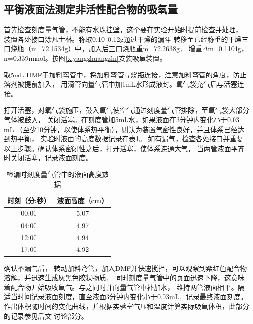 \documentclass[a4paper,zihao=5,UTF8]{ctexart}
\begin{document}
    \subsection{平衡液面法测定非活性配合物的吸氧量}
    首先检查刻度量气管，不能有水珠挂壁，这个要在实验开始时提前检查并处理，
    装置各处接口涂凡士林。称取0.10~0.12g\ce{[Co(II)(Salen)]}通过干燥的漏斗
    转移至已经称重的干燥三口烧瓶（m=72.1534g）中，加入后三口烧瓶重m=72.2638g，
    增重$\Delta$m=0.1104g，n=0.339mmol。按图\ref{xiyangzhuangzhi}安装吸氧装置。
    \par 
    取5mL DMF于加料弯管中，将加料弯管与烧瓶连接，注意加料弯管的角度，防止溶剂被提前加入，
    用滴管向量气管中加1mL水形成液封。氧气袋充气后与活塞连接。
    \par 
	打开活塞，对氧气袋施压，鼓入氧气使空气通过刻度量气管排除，至氧气袋大部分气体被鼓入，
    关闭活塞。在刻度管加5mL水，如果液面在3分钟内变化小于0.03 mL
    （至少10分钟，以使体系热平衡），则认为装置气密性良好，并且体系已经达到热平衡，
    实验时液面的高度数据记录在表\ref{jianlougaodushuju}。
    如有漏气，检查各处接口并重复以上步骤。确认体系密闭性之后，打开活塞，使体系连通大气，
    当两管液面平齐时关闭活塞，记录液面刻度。
    \begin{table}[htbp]
        \caption{检漏时刻度量气管中的液面高度数据}
        \centering
        \label{jianlougaodushuju}
        \begin{tabular}[htbp]{cc}
            \toprule
            时刻（分:秒） & 液面高度（cm）\\
            \midrule
            00:00 & 5.07 \\
            04:00 & 4.97 \\
            12:00 & 4.94 \\
            17:00 & 4.92 \\
            \bottomrule
        \end{tabular}
    \end{table}
    \par
    确认不漏气后，
    转动加料弯管，加入DMF并快速搅拌，可以观察到紫红色配合物溶解，并迅速生成灰黑色胶状物质，
    同时刻度量气管中的页面迅速下降，这意味着配合物开始吸收氧气。与之同时并向量气管中补加水，
    维持两管液面相平。隔适当时间记录液面刻度，直至液面3分钟内变化小于0.03mL，记录最终液面刻度。
    作出体积随时间的变化曲线，并根据实验室气压和温度计算实际吸氧体积，此部分的记录参见后文
    讨论部分。
\end{document}
